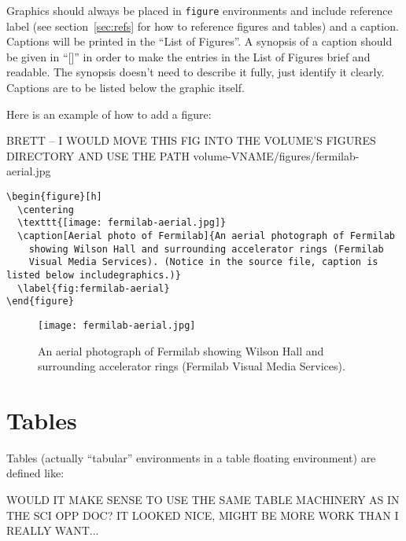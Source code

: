 Graphics should always be placed in \texttt{figure} environments and include reference label (see
section~\ref{sec:refs} for how to reference figures and tables) and a
caption.  Captions will be printed in the ``List of Figures''.  A
synopsis of a caption should be given in ``[]'' in order to make the
entries in the List of Figures brief and readable.  The synopsis doesn't need to describe it fully, just identify it clearly. Captions are to be listed below the graphic itself.

Here is an example of how to add a figure:

BRETT -- I WOULD MOVE THIS FIG INTO THE VOLUME'S FIGURES DIRECTORY AND USE THE PATH
volume-VNAME/figures/fermilab-aerial.jpg

\begin{verbatim}
\begin{figure}[h]
  \centering
  \texttt{[image: fermilab-aerial.jpg]}
  \caption[Aerial photo of Fermilab]{An aerial photograph of Fermilab
    showing Wilson Hall and surrounding accelerator rings (Fermilab
    Visual Media Services). (Notice in the source file, caption is listed below includegraphics.)}
  \label{fig:fermilab-aerial}
\end{figure}
\end{verbatim}

\begin{figure}[h]
  \centering
  \texttt{[image: fermilab-aerial.jpg]}
  \caption[Aerial Photo of Fermilab]{An aerial photograph of Fermilab
    showing Wilson Hall and surrounding accelerator rings (Fermilab
    Visual Media Services).}
  \label{fig:fermilab-aerial}
\end{figure}

\section{Tables}
\label{sec:tables}

Tables (actually ``tabular'' environments in a table floating environment) are defined like:

WOULD IT MAKE SENSE TO USE THE SAME TABLE MACHINERY AS IN THE SCI OPP DOC? IT LOOKED NICE,
MIGHT BE MORE WORK THAN I REALLY WANT...

